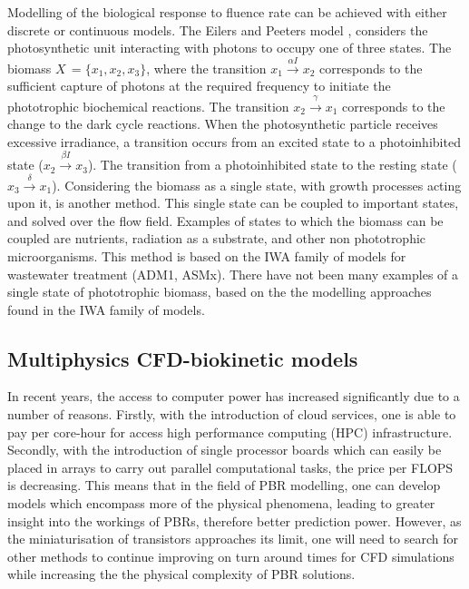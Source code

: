\skippingparagraph
Modelling of the biological response to fluence rate can be achieved with either discrete or continuous models. The Eilers and Peeters model \cite{eilers1988}, considers the photosynthetic unit interacting with photons to occupy one of three states. The biomass $X \,= \{x_1, x_2, x_3\}$, where the transition $x_1 \xrightarrow{\alpha I} x_2$ corresponds to the sufficient capture of photons at the required frequency to initiate the phototrophic biochemical reactions. The transition $x_2 \xrightarrow{\gamma} x_1$ corresponds to the change to the dark cycle reactions. When the photosynthetic particle receives excessive irradiance, a transition occurs from an excited state to a photoinhibited state ($x_2 \xrightarrow{\beta I} x_3$). The transition from a photoinhibited state to the resting state ($x_3 \xrightarrow{\delta} x_1$). 
\skippingparagraph
Considering the biomass as a single state, with growth processes acting upon it, is another method. This single state can be coupled to important states, and solved over the flow field. Examples of states to which the biomass can be coupled are nutrients, radiation as a substrate, and other non phototrophic microorganisms. This method is based on the IWA family of models for wastewater treatment (ADM1, ASMx). There have not been many examples of a single state of phototrophic biomass, based on the the modelling approaches found in the IWA family of models. %


\subsection{Multiphysics CFD-biokinetic models}
\label{S:2.6}
In recent years, the access to computer power has increased significantly due to a number of reasons. Firstly, with the introduction of cloud services, one is able to pay per core-hour for access high performance computing (HPC) infrastructure. Secondly, with the introduction of single processor boards which can easily be placed in arrays to carry out parallel computational tasks, the price per FLOPS is decreasing. This means that in the field of PBR modelling, one can develop models which encompass more of the physical phenomena, leading to greater insight into the workings of PBRs, therefore better prediction power. However, as the miniaturisation of transistors approaches its limit, one will need to search for other methods to continue improving on turn around times for CFD simulations while increasing the the physical complexity of PBR solutions. 

